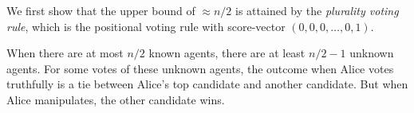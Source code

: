 We first show that the upper bound of $\approx n/2$ is attained by the \emph{plurality voting rule}, which is the positional voting rule with score-vector $(0,0,0,\ldots,0,1)$.


\begin{lemmarep}
\label{lem:lower-plurality}
\end{lemmarep}
\begin{proofsketch}
When there are at most $n/2$ known agents, there are at least $n/2-1$ unknown agents. For some votes of these unknown agents, the outcome when Alice votes truthfully is a tie between Alice's top candidate and another candidate. But when Alice manipulates, the other candidate wins.
\end{proofsketch}

